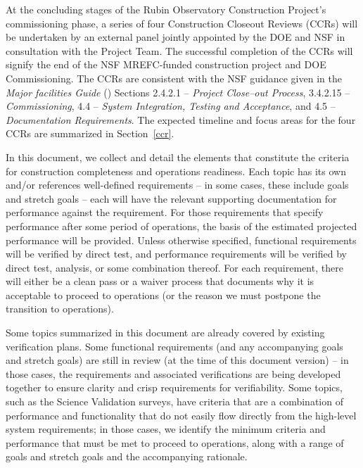 At the concluding stages of the Rubin Observatory Construction Project's commissioning phase, a series of four Construction Closeout Reviews (CCRs) will be undertaken by an external panel jointly appointed by the DOE and NSF in consultation with the Project Team.
The successful completion of the CCRs will signify the end of the NSF MREFC-funded construction project and DOE Commissioning.
The CCRs are consistent with the NSF guidance given in the {\it Major facilities Guide} () Sections 2.4.2.1 -- {\it Project Close--out Process}, 3.4.2.15 -- {\it Commissioning}, 4.4 -- {\it System Integration, Testing and Acceptance}, and 4.5 -- {\it Documentation Requirements}.
The expected timeline and focus areas for the four CCRs are summarized in Section~\ref{ccr}.



In this document, we collect and detail the elements that constitute the criteria for construction completeness and operations readiness.
Each topic has its own and/or references well-defined requirements -- in some cases, these include goals and stretch goals -- each will have the relevant supporting documentation for performance against the requirement.
For those requirements that specify performance after some period of operations, the basis of the estimated projected performance will be provided.
Unless otherwise specified, functional requirements will be verified by direct test, and performance requirements will be verified by direct test, analysis, or some combination thereof.
For each requirement, there will either be a clean pass or a waiver process that documents why it is acceptable to proceed to operations (or the reason we must postpone the transition to operations).

Some topics summarized in this document are already covered by existing verification plans.
Some functional requirements (and any accompanying goals and stretch goals) are still in review (at the time of this document version) -- in those cases, the requirements and associated verifications are being developed together to ensure clarity and crisp requirements for verifiability.
Some topics, such as the Science Validation surveys, have criteria that are a combination of performance and functionality that do not easily flow directly from the high-level system requirements; in those cases, we identify the minimum criteria and performance that must be met to proceed to operations, along with a range of goals and stretch goals and the accompanying rationale.

